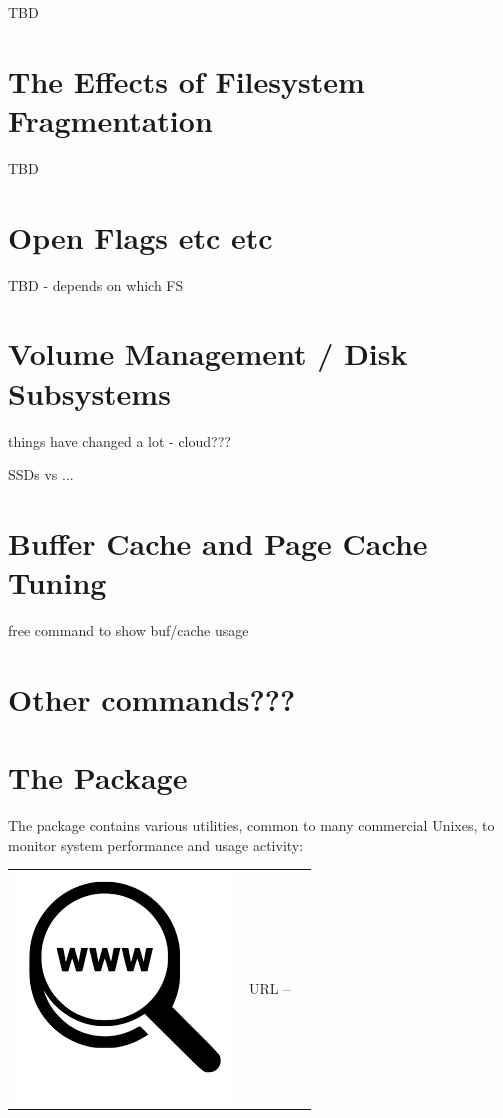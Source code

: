 TBD

\section{The Effects of Filesystem Fragmentation}

TBD


\section{Open Flags etc etc}

TBD - depends on which FS

%

\section{Volume Management / Disk Subsystems}

things have changed a lot - cloud???

SSDs vs ...

%

\section{Buffer Cache and Page Cache Tuning}

free command to show buf/cache usage


\section{Other commands???}

\section{The  Package}

The  package contains various utilities, common to many commercial Unixes, to monitor system performance and usage activity:

\begin{table}[h]
\begin{tabular}{lcl}
\parbox[r]{0.5in}{\includegraphics[scale=0.15]{figures/url.png}} & \parbox[l]{0.5in}{URL  -- } & \parbox[l]{3in}{}
\end{tabular}
\end{table}

